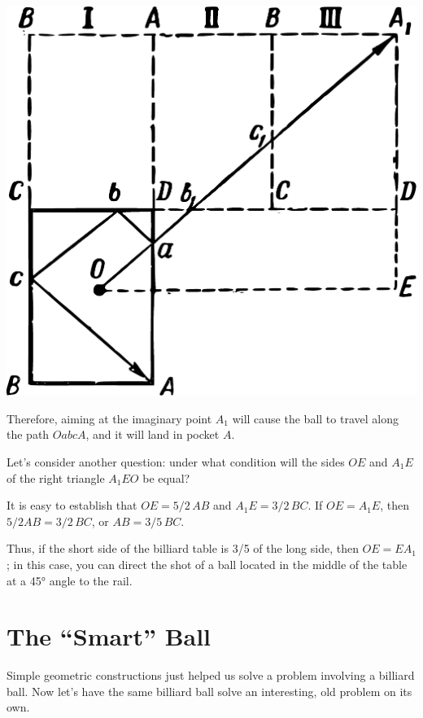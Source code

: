 \begin{marginfigure}%
\centering
\includegraphics[width=\textwidth]{figures/ch-10/fig-151.pdf}
\end{marginfigure}


Therefore, aiming at the imaginary point $A_{1}$ will cause the ball to travel along the path \( OabcA \), and it will land in pocket $A$.

Let’s consider another question: under what condition will the sides \( OE \) and \( A_{1}E \) of the right triangle \( A_{1}EO \) be equal?

It is easy to establish that \( OE = 5/2 \, AB \) and \( A_{1}E = 3/2\, BC \). If \( OE = A_{1}E \), then \( 5/2 AB = 3/2\, BC \), or \( AB = 3/5 \, BC \).

Thus, if the short side of the billiard table is 3/5 of the long side, then \( OE = EA_{1} \); in this case, you can direct the shot of a ball located in the middle of the table at a \ang{45} angle to the rail.

\section{The ``Smart'' Ball}
\label{sec-10.8}

Simple geometric constructions just helped us solve a problem involving a billiard ball. Now let's have the same billiard ball solve an interesting, old problem on its own.

